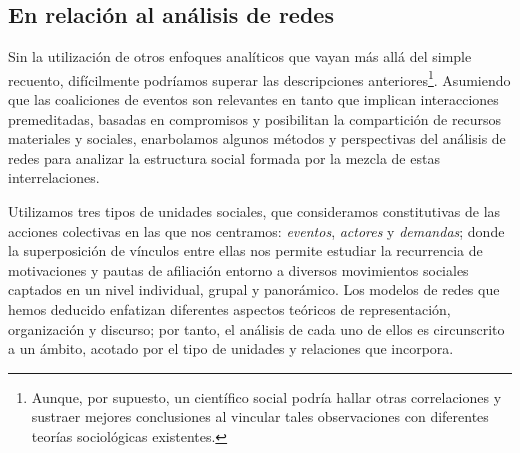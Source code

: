 \documentclass[letterpaper, 11pt]{book}
\theoremstyle{definition}
\theoremstyle{remark}
\begin{document}





\subsection{En relación al análisis de redes}
\label{subsec:Contrib_AporteRedes}


Sin la utilización de otros enfoques analíticos que vayan más allá del simple recuento, difícilmente podríamos superar las descripciones anteriores\footnote{
    Aunque, por supuesto, un científico social podría hallar otras correlaciones y sustraer mejores conclusiones al vincular tales observaciones con diferentes teorías sociológicas existentes. 
}. 
Asumiendo que las coaliciones de eventos son relevantes en tanto que implican interacciones premeditadas, basadas en compromisos y posibilitan la compartición de recursos materiales y sociales, enarbolamos algunos métodos y perspectivas del análisis de redes para analizar la estructura social formada por la mezcla de estas interrelaciones. 



Utilizamos tres tipos de unidades sociales, que consideramos constitutivas de las acciones colectivas en las que nos centramos: \emph{eventos}, \emph{actores} y \emph{demandas}; donde la superposición de vínculos entre ellas nos permite estudiar la recurrencia de motivaciones y pautas de afiliación entorno a diversos movimientos sociales captados en un nivel individual, grupal y panorámico. 
Los modelos de redes que hemos deducido enfatizan diferentes aspectos teóricos de representación, organización y discurso; por tanto, el análisis de cada uno de ellos es circunscrito a un ámbito, acotado por el tipo de unidades y relaciones que incorpora. 
\end{document}
